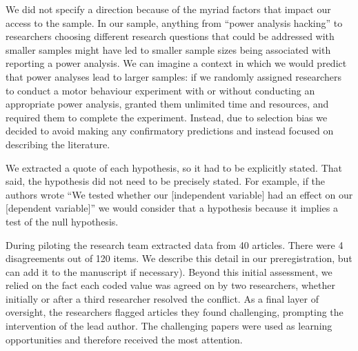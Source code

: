 \documentclass[final]{article}
\begin{document}

We did not specify a direction because of the myriad factors that impact our access to the sample. In our sample, anything from ``power analysis hacking'' to researchers choosing different research questions that could be addressed with smaller samples might have led to smaller sample sizes being associated with reporting a power analysis. We can imagine a context in which we would predict that power analyses lead to larger samples: if we randomly assigned researchers to conduct a motor behaviour experiment with or without conducting an appropriate power analysis, granted them unlimited time and resources, and required them to complete the experiment. Instead, due to selection bias we decided to avoid making any confirmatory predictions and instead focused on describing the literature.


We extracted a quote of each hypothesis, so it had to be explicitly stated. That said, the hypothesis did not need to be precisely stated. For example, if the authors wrote ``We tested whether our {[}independent variable{]} had an effect on our {[}dependent variable{]}'' we would consider that a hypothesis because it implies a test of the null hypothesis.


During piloting the research team extracted data from 40 articles. There were 4 disagreements out of 120 items. We describe this detail in our preregistration, but can add it to the manuscript if necessary). Beyond this initial assessment, we relied on the fact each coded value was agreed on by two researchers, whether initially or after a third researcher resolved the conflict. As a final layer of oversight, the researchers flagged articles they found challenging, prompting the intervention of the lead author. The challenging papers were used as learning opportunities and therefore received the most attention.
\end{document}
